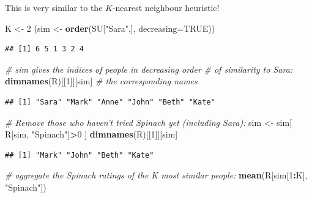 \documentclass[10pt,b5paper,krantz1]{krantz}
\newenvironment{Shaded}{\begin{snugshade}}{\end{snugshade}}
\newcommand{\CommentTok}[1]{\textcolor[rgb]{0.37,0.37,0.37}{\textit{#1}}}
\newcommand{\DataTypeTok}[1]{\textcolor[rgb]{0.27,0.27,0.27}{#1}}
\newcommand{\DecValTok}[1]{\textcolor[rgb]{0.06,0.06,0.06}{#1}}
\newcommand{\KeywordTok}[1]{\textcolor[rgb]{0.27,0.27,0.27}{\textbf{#1}}}
\newcommand{\NormalTok}[1]{#1}
\newcommand{\OperatorTok}[1]{\textcolor[rgb]{0.43,0.43,0.43}{\textbf{#1}}}
\newcommand{\OtherTok}[1]{\textcolor[rgb]{0.37,0.37,0.37}{#1}}
\newcommand{\StringTok}[1]{\textcolor[rgb]{0.5,0.5,0.5}{#1}}
\begin{document}
This is very similar to the \(K\)-nearest neighbour heuristic!

\begin{Shaded}
\begin{Highlighting}[]
\NormalTok{K <-}\StringTok{ }\DecValTok{2}
\NormalTok{(sim <-}\StringTok{ }\KeywordTok{order}\NormalTok{(SU[}\StringTok{"Sara"}\NormalTok{,], }\DataTypeTok{decreasing=}\OtherTok{TRUE}\NormalTok{))}
\end{Highlighting}
\end{Shaded}

\begin{verbatim}
## [1] 6 5 1 3 2 4
\end{verbatim}

\begin{Shaded}
\begin{Highlighting}[]
\CommentTok{# sim gives the indices of people in decreasing order}
\CommentTok{# of similarity to Sara:}
\KeywordTok{dimnames}\NormalTok{(R)[[}\DecValTok{1}\NormalTok{]][sim] }\CommentTok{# the corresponding names}
\end{Highlighting}
\end{Shaded}

\begin{verbatim}
## [1] "Sara" "Mark" "Anne" "John" "Beth" "Kate"
\end{verbatim}

\begin{Shaded}
\begin{Highlighting}[]
\CommentTok{# Remove those who haven't tried Spinach yet (including Sara):}
\NormalTok{sim <-}\StringTok{ }\NormalTok{sim[ R[sim, }\StringTok{"Spinach"}\NormalTok{]}\OperatorTok{>}\DecValTok{0}\NormalTok{ ]}
\KeywordTok{dimnames}\NormalTok{(R)[[}\DecValTok{1}\NormalTok{]][sim]}
\end{Highlighting}
\end{Shaded}

\begin{verbatim}
## [1] "Mark" "John" "Beth" "Kate"
\end{verbatim}

\begin{Shaded}
\begin{Highlighting}[]
\CommentTok{# aggregate the Spinach ratings of the K most similar people:}
\KeywordTok{mean}\NormalTok{(R[sim[}\DecValTok{1}\OperatorTok{:}\NormalTok{K], }\StringTok{"Spinach"}\NormalTok{])}
\end{Highlighting}
\end{Shaded}
\end{document}
